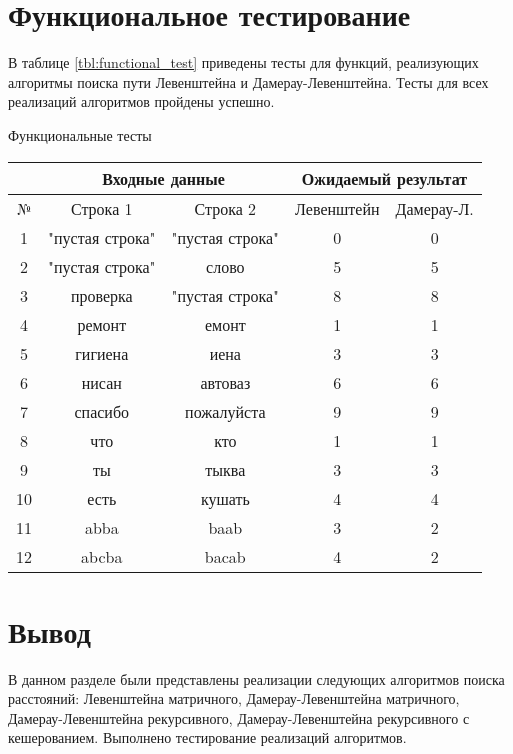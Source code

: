 \section{Функциональное тестирование}

В таблице \ref{tbl:functional_test} приведены тесты для функций, реализующих алгоритмы поиска пути Левенштейна и Дамерау-Левенштейна. Тесты для всех реализаций алгоритмов пройдены успешно.
	\begin{center}

				\begin{threeparttable}
					\captionsetup{justification=raggedright,singlelinecheck=off}
					\caption{\label{tbl:functional_test} Функциональные тесты}
					\begin{tabular}{|c|c|c|c|c|}
						\hline
						& \multicolumn{2}{c|}{Входные данные}  & \multicolumn{2}{c|}{Ожидаемый результат} \\
						\hline
						№&Строка 1&Строка 2&Левенштейн&Дамерау-Л. \\
						\hline
						1&"пустая строка"&"пустая строка"&0&0 \\
						\hline
						2&"пустая строка"&слово&5&5 \\
						\hline
						3&проверка&"пустая строка"&8&8 \\
						\hline
						4&ремонт&емонт&1&1 \\
						\hline
						5&гигиена&иена&3&3 \\
						\hline
						6&нисан&автоваз&6&6 \\
						\hline
						7&спасибо&пожалуйста&9&9 \\
						\hline
						8&что&кто&1&1 \\
						\hline
						9&ты&тыква&3&3 \\
						\hline
						10&есть&кушать&4&4 \\
						\hline
						11&abba&baab&3&2 \\
						\hline
						12&abcba&bacab&4&2 \\
						\hline
					\end{tabular}
				\end{threeparttable}


	\end{center}



\section*{Вывод}
В данном разделе были представлены реализации следующих алгоритмов поиска расстояний: Левенштейна матричного, Дамерау-Левенштейна матричного, Дамерау-Левенштейна рекурсивного, Дамерау-Левенштейна рекурсивного с кешерованием. Выполнено тестирование реализаций алгоритмов.